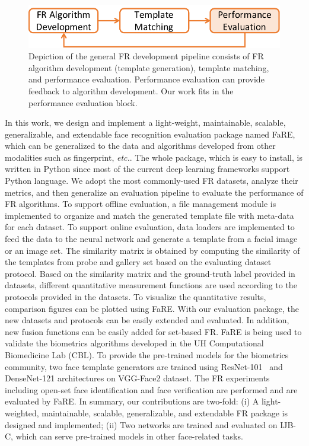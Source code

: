 \documentclass{article}
\newcommand{\latinphrase}[1]{\textit{#1}}
\newcommand{\etc}{\latinphrase{etc.}\xspace}
\begin{document}
\begin{figure}[tb]
    \centering
    \centerline{\includegraphics[width=\linewidth]{FaRE-Pip}}
    \caption{Depiction of the general FR development pipeline consists of FR algorithm development (template generation), template matching, and performance evaluation. Performance evaluation can provide feedback to algorithm development. Our work fits in the performance evaluation block.}
    \label{FIG:FaRE-Pip}
\end{figure}

In this work, we design and implement a light-weight, maintainable, scalable, generalizable, and extendable face recognition evaluation package named FaRE, which can be generalized to the data and algorithms developed from other modalities such as fingerprint, \etc.
The whole package, which is easy to install, is written in Python since most of the current deep learning frameworks support Python language.
We adopt the most commonly-used FR datasets, analyze their metrics, and then generalize an evaluation pipeline to evaluate the performance of FR algorithms.
To support offline evaluation, a file management module is implemented to organize and match the generated template file with meta-data for each dataset. 
To support online evaluation, data loaders are implemented to feed the data to the neural network and generate a template from a facial image or an image set.
The similarity matrix is obtained by computing the similarity of the templates from probe and gallery set based on the evaluating dataset protocol.
Based on the similarity matrix and the ground-truth label provided in datasets, different quantitative measurement functions are used according to the protocols provided in the datasets.
To visualize the quantitative results, comparison figures can be plotted using FaRE.
With our evaluation package, the new datasets and protocols can be easily extended and evaluated.
In addition, new fusion functions can be easily added for set-based FR.
FaRE is being used to validate the biometrics algorithms developed in the UH Computational Biomedicine Lab (CBL).
To provide the pre-trained models for the biometrics community, two face template generators are trained using \mbox{ResNet-101 \cite{He_2016_17161}} and DenseNet-121 \cite{Huang_2017_190102} architectures on VGG-Face2 \cite{Cao_2018_17830} dataset.
The FR experiments including open-set face identification and face verification are performed and are evaluated by FaRE.
In summary, our contributions are two-fold: (i) A light-weighted, maintainable, scalable, generalizable, and extendable FR package is designed and implemented; (ii) Two networks are trained and evaluated on IJB-C, which can serve pre-trained models in other face-related tasks.
\end{document}
